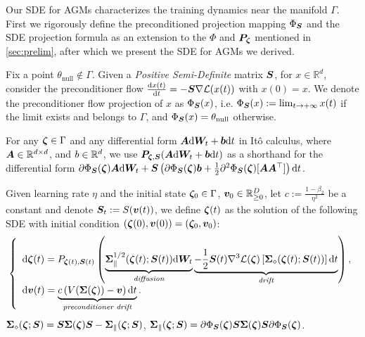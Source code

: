 Our SDE for AGMs characterizes the training dynamics near the manifold $\Gamma$. First we rigorously define the preconditioned projection mapping $\Phi_{\bm{S}}$ and the SDE projection formula as an extension to the $\Phi$ and ${\bm{P}}_{{\bm{\zeta}}}$ mentioned in \cref{sec:prelim}, after which we present the SDE for AGMs we derived.
\begin{definition}\label{def:preconditioner-flow}
    Fix a point \( \theta_{\text{null}} \notin \Gamma \). Given a \textit{Positive Semi-Definite} matrix ${\bm{S}}$, for \( x \in \mathbb{R}^d \), consider the preconditioner flow $\frac{\mathrm{d} x(t)}{\mathrm{d} t} = -{\bm{S}}\nabla \mathcal{L}(x(t))$ with $x(0) = x$. We denote the preconditioner flow projection of \( x \) as \( \Phi_{{\bm{S}}}(x) \), i.e. $\Phi_{{\bm{S}}}(x) := \lim_{t \to +\infty} x(t)$ if the limit exists and belongs to $\Gamma$, and $\Phi_{{\bm{S}}}(x) = \theta_{\text{null}}$ otherwise.
\end{definition}
\begin{definition}
    For any ${\bm{\zeta}} \in \Gamma$ and any differential form ${\bm{A}} \mathrm{d} {\bm{W}}_t + {\bm{b}} \mathrm{d} t$ in Itô calculus, where ${\bm{A}} \in \mathbb{R}^{d \times d}$, and $b \in \mathbb{R}^{d}$, we use ${\bm{P}}_{{\bm{\zeta}},{\bm{S}}}({\bm{A}}\mathrm{d} {\bm{W}}_t + {\bm{b}} \mathrm{d} t)$ as a shorthand for the differential form $\partial \Phi_{{\bm{S}}}({\bm{\zeta}}){\bm{A}}\mathrm{d} {\bm{W}}_t + {\bm{S}} \left(\partial \Phi_{{\bm{S}}}({\bm{\zeta}}){\bm{b}} + \frac{1}{2}\partial^2 \Phi_{{\bm{S}}}({\bm{\zeta}})[{\bm{A}}{\bm{A}}^\top]\right)\mathrm{d} t$.
\end{definition}
\begin{definition}
    Given learning rate $\eta$ and the initial state ${\bm{\zeta}}_0\in \Gamma$, ${\bm{v}}_0 \in \mathbb{R}_{\ge 0}^D$, let $c := \frac{1-\beta_2}{\eta^2}$ be a constant and denote ${\bm{S}}_t:=S({\bm{v}}(t))$, we define ${\bm{\zeta}}(t)$ as the solution of the following SDE with initial condition $\left({\bm{\zeta}}(0),{\bm{v}}(0)\right)=\left({\bm{\zeta}}_0, {\bm{v}}_0\right)$:
    \begin{align}
        \left\{\begin{array}{l}
             \mathrm{d} {\bm{\zeta}}(t) = P_{{\bm{\zeta}}(t),{\bm{S}}(t)}\left(\underbrace{{\bm{\Sigma}}_{\parallel}^{1/2}({\bm{\zeta}}(t); {\bm{S}}(t))\mathrm{d} {\bm{W}}_t}_{\textit{diffusion}} \underbrace{- \frac{1}{2}{\bm{S}}(t)\nabla^3\mathcal{L}({\bm{\zeta}})\left[{\bm{\Sigma}}_{\diamond}({\bm{\zeta}}(t); {\bm{S}}(t))\right]\mathrm{d} t}_{\textit{drift}}\right), \\
             \mathrm{d} {\bm{v}}(t) = \underbrace{c \left(V({\bm{\Sigma}}({\bm{\zeta}})) - {\bm{v}}\right) \mathrm{d} t }_{\textit{preconditioner drift}}.
        \end{array}\right. \label{equ:AGMs-SDE}
    \end{align}
    ${\bm{\Sigma}}_{\diamond}({\bm{\zeta}}; {\bm{S}}) = 
    {\bm{S}} {\bm{\Sigma}}({\bm{\zeta}}) {\bm{S}} -
    {\bm{\Sigma}}_{\parallel}({\bm{\zeta}}; {\bm{S}})$,
    ${\bm{\Sigma}}_{\parallel}({\bm{\zeta}}; {\bm{S}}) = \partial \Phi_{{\bm{S}}}({\bm{\zeta}})
     {\bm{S}} {\bm{\Sigma}}({\bm{\zeta}}) {\bm{S}} \partial \Phi_{{\bm{S}}}({\bm{\zeta}})$.
\end{definition}

